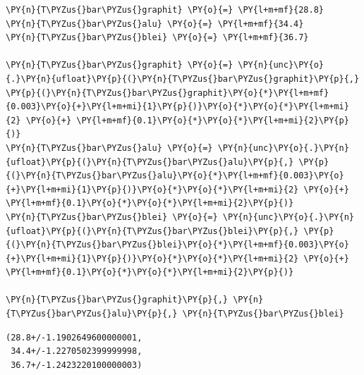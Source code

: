     \begin{tcolorbox}[breakable, size=fbox, boxrule=1pt, pad at break*=1mm,colback=cellbackground, colframe=cellborder]
\begin{Verbatim}[commandchars=\\\{\}]
\PY{n}{T\PYZus{}bar\PYZus{}graphit} \PY{o}{=} \PY{l+m+mf}{28.8}
\PY{n}{T\PYZus{}bar\PYZus{}alu} \PY{o}{=} \PY{l+m+mf}{34.4}
\PY{n}{T\PYZus{}bar\PYZus{}blei} \PY{o}{=} \PY{l+m+mf}{36.7}

\PY{n}{T\PYZus{}bar\PYZus{}graphit} \PY{o}{=} \PY{n}{unc}\PY{o}{.}\PY{n}{ufloat}\PY{p}{(}\PY{n}{T\PYZus{}bar\PYZus{}graphit}\PY{p}{,} \PY{p}{(}\PY{n}{T\PYZus{}bar\PYZus{}graphit}\PY{o}{*}\PY{l+m+mf}{0.003}\PY{o}{+}\PY{l+m+mi}{1}\PY{p}{)}\PY{o}{*}\PY{o}{*}\PY{l+m+mi}{2} \PY{o}{+} \PY{l+m+mf}{0.1}\PY{o}{*}\PY{o}{*}\PY{l+m+mi}{2}\PY{p}{)}
\PY{n}{T\PYZus{}bar\PYZus{}alu} \PY{o}{=} \PY{n}{unc}\PY{o}{.}\PY{n}{ufloat}\PY{p}{(}\PY{n}{T\PYZus{}bar\PYZus{}alu}\PY{p}{,} \PY{p}{(}\PY{n}{T\PYZus{}bar\PYZus{}alu}\PY{o}{*}\PY{l+m+mf}{0.003}\PY{o}{+}\PY{l+m+mi}{1}\PY{p}{)}\PY{o}{*}\PY{o}{*}\PY{l+m+mi}{2} \PY{o}{+} \PY{l+m+mf}{0.1}\PY{o}{*}\PY{o}{*}\PY{l+m+mi}{2}\PY{p}{)}
\PY{n}{T\PYZus{}bar\PYZus{}blei} \PY{o}{=} \PY{n}{unc}\PY{o}{.}\PY{n}{ufloat}\PY{p}{(}\PY{n}{T\PYZus{}bar\PYZus{}blei}\PY{p}{,} \PY{p}{(}\PY{n}{T\PYZus{}bar\PYZus{}blei}\PY{o}{*}\PY{l+m+mf}{0.003}\PY{o}{+}\PY{l+m+mi}{1}\PY{p}{)}\PY{o}{*}\PY{o}{*}\PY{l+m+mi}{2} \PY{o}{+} \PY{l+m+mf}{0.1}\PY{o}{*}\PY{o}{*}\PY{l+m+mi}{2}\PY{p}{)}

\PY{n}{T\PYZus{}bar\PYZus{}graphit}\PY{p}{,} \PY{n}{T\PYZus{}bar\PYZus{}alu}\PY{p}{,} \PY{n}{T\PYZus{}bar\PYZus{}blei}
\end{Verbatim}
\end{tcolorbox}

            \begin{tcolorbox}[breakable, size=fbox, boxrule=.5pt, pad at break*=1mm, opacityfill=0]
\begin{Verbatim}[commandchars=\\\{\}]
(28.8+/-1.1902649600000001,
 34.4+/-1.2270502399999998,
 36.7+/-1.2423220100000003)
\end{Verbatim}
\end{tcolorbox}
        
